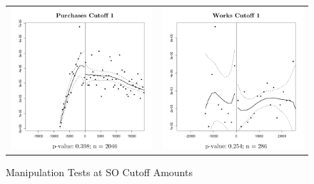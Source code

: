 \documentclass[11pt]{article}
\begin{document}
\begin{figure}[!htbp] \centering
  \caption{\label{fig:manipulationtests} Manipulation Tests at SO Cutoff Amounts}
  \begin{tabular}{cc}
  \includegraphics[scale=.24]{purchasesmanipulation1} & \includegraphics[scale=.24]{worksmanipulation1} \\

\end{tabular}
\end{figure}
\end{document}
